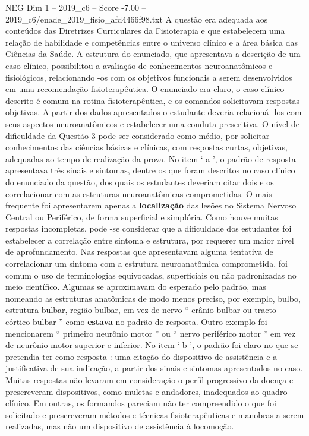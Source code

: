 \begin{textsample}{NEG Dim 1 – 2019\_c6 – Score -7.00 – 2019\_c6/enade\_2019\_fisio\_afd4466f98.txt}
A questão era adequada aos conteúdos das Diretrizes Curriculares da Fisioterapia e que estabelecem uma relação de habilidade e competências entre o universo clínico e a área básica das Ciências da Saúde.
A estrutura do enunciado, que apresentava a descrição de um caso clínico, possibilitou a avaliação de conhecimentos neuroanatômicos e fisiológicos, relacionando -os com os objetivos funcionais a serem desenvolvidos em uma recomendação fisioterapêutica.
O enunciado era claro, o caso clínico descrito é comum na rotina fisioterapêutica, e os comandos solicitavam respostas objetivas.
A partir dos dados apresentados o estudante deveria relacioná -los com seus aspectos neuroanatômicos e estabelecer uma conduta prescritiva.
O nível de dificuldade da Questão 3 pode ser considerado como médio, por solicitar conhecimentos das ciências básicas e clínicas, com respostas curtas, objetivas, adequadas ao tempo de realização da prova.
No item ‘ a ’, o padrão de resposta apresentava três sinais e sintomas, dentre os que foram descritos no caso clínico do enunciado da questão, dos quais os estudantes deveriam citar dois e os correlacionar com as estruturas neuroanatômicas comprometidas.
O mais frequente foi apresentarem apenas a \textbf{localização} das lesões no Sistema Nervoso Central ou Periférico, de forma superficial e simplória.
Como houve muitas respostas incompletas, pode -se considerar que a dificuldade dos estudantes foi estabelecer a correlação entre sintoma e estrutura, por requerer um maior nível de aprofundamento.
Nas respostas que apresentavam alguma tentativa de correlacionar um sintoma com a estrutura neuroanatômica comprometida, foi comum o uso de terminologias equivocadas, superficiais ou não padronizadas no meio científico.
Algumas se aproximavam do esperado pelo padrão, mas nomeando as estruturas anatômicas de modo menos preciso, por exemplo, bulbo, estrutura bulbar, região bulbar, em vez de nervo “ crânio bulbar ou tracto córtico-bulbar ” como \textbf{estava} no padrão de resposta.
Outro exemplo foi mencionarem “ primeiro neurônio motor ” ou “ nervo periférico motor ” em vez de neurônio motor superior e inferior.
No item ‘ b ’, o padrão foi claro no que se pretendia ter como resposta : uma citação do dispositivo de assistência e a justificativa de sua indicação, a partir dos sinais e sintomas apresentados no caso.
Muitas respostas não levaram em consideração o perfil progressivo da doença e prescreveram dispositivos, como muletas e andadores, inadequados ao quadro clínico.
Em outras, os formandos pareciam não ter compreendido o que foi solicitado e prescreveram métodos e técnicas fisioterapêuticas e manobras a serem realizadas, mas não um dispositivo de assistência à locomoção.

\end{textsample}

